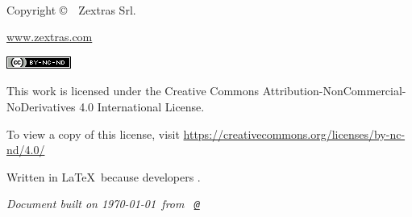 
\newpage
~\vfill
\thispagestyle{empty}

Copyright \copyright\ \the\year\ Zextras Srl. %

\url{www.zextras.com} %

\begingroup
\normalfont
\includegraphics[height=\fontcharht\font`\B]{template/cc-by-nc-sa.png}
\endgroup

This work is licensed under the Creative Commons Attribution-NonCommercial-NoDerivatives 4.0 International License.

To view a copy of this license, visit \url{https://creativecommons.org/licenses/by-nc-nd/4.0/}

\newcommand*{\writtenInLatex}{Written in \LaTeX\ because developers \ExcuseToUseLatex.}
\writtenInLatex

\textit{Document built on \today\ from \texttt{\branchName\ \href{https://github.com/ZeXtras/ZimbraDrive/tree/\commitId}{@\shortCommitId}}} %

